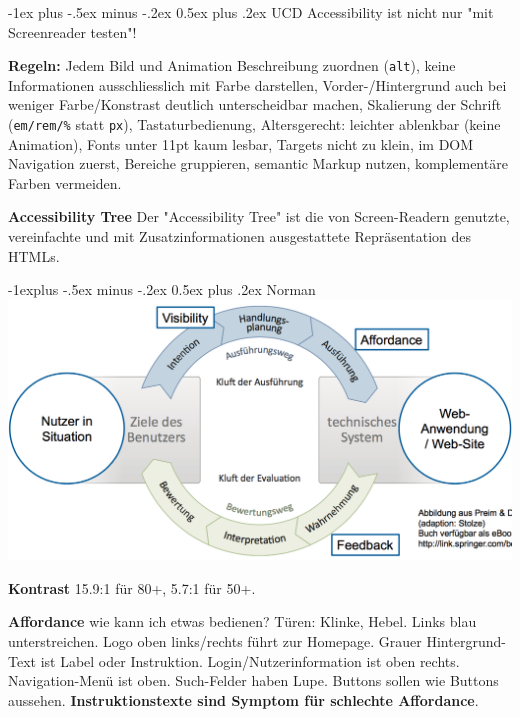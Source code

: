 \documentclass[a4paper, fontsize=6pt]{scrartcl}
\makeatletter
\renewcommand{\section}{\@startsection{section}{1}{0mm}%
    {-1ex plus -.5ex minus -.2ex}%
    {0.5ex plus .2ex}%
    {\normalfont\large\bfseries}}
\renewcommand{\subsection}{\@startsection{subsection}{2}{0mm}%
    {-1explus -.5ex minus -.2ex}%
    {0.5ex plus .2ex}%
    {\normalfont\normalsize\bfseries}}
\newcommand{\html}[1]{\texttt{#1}}
\makeatother
\begin{document}
\begin{multicols*}{5}
\section{UCD}
Accessibility ist nicht nur "mit Screenreader testen"!

\textbf{Regeln:} Jedem Bild und Animation Beschreibung zuordnen (\html{alt}), keine Informationen ausschliesslich mit Farbe darstellen, Vorder-/Hintergrund auch bei weniger Farbe/Konstrast deutlich unterscheidbar machen, Skalierung der Schrift (\html{em/rem/\%} statt \html{px}), Tastaturbedienung, Altersgerecht: leichter ablenkbar (keine Animation), Fonts unter 11pt kaum lesbar, Targets nicht zu klein, im DOM Navigation zuerst, Bereiche gruppieren, semantic Markup nutzen, komplementäre Farben vermeiden.

\textbf{Accessibility Tree} Der "Accessibility Tree" ist die von Screen-Readern genutzte, vereinfachte und mit Zusatzinformationen ausgestattete Repräsentation des HTMLs.


\subsection{Norman}
\includegraphics[scale=0.13]{norman.png}

\textbf{Kontrast} 15.9:1 für 80+, 5.7:1 für 50+.

\textbf{Affordance} wie kann ich etwas bedienen? Türen: Klinke, Hebel. Links blau unterstreichen. Logo oben links/rechts führt zur Homepage. Grauer Hintergrund-Text ist Label oder Instruktion. Login/Nutzerinformation ist oben rechts. Navigation-Menü ist oben. Such-Felder haben Lupe. Buttons sollen wie Buttons aussehen.
\textbf{Instruktionstexte sind Symptom für schlechte Affordance}.


\end{multicols*}
\end{document}
